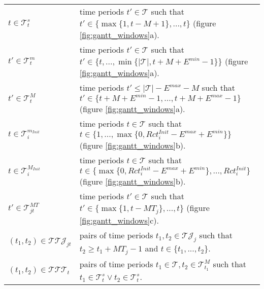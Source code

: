 \documentclass[a4paper,onecolumn,fleqn]{article}
\begin{document}
        \begin{tabular}{p{30mm}p{95mm}}
            $t \in \mathcal{T}^s_t$ &  time periods $t' \in \mathcal{T}$ such that $t' \in \{ \max{\{1, t - M+1\}},  ..., {t}\}$ (figure \ref{fig:gantt_windows}a). \\
            $t' \in \mathcal{T}^m_t$ &  time periods $t' \in \mathcal{T}$ such that $t' \in \{ {t}, ..., \min{\{|\mathcal{T}|, t + M + E^{min}-1\}}\}$ (figure \ref{fig:gantt_windows}a). \\
            $t' \in \mathcal{T}^M_t$ &  time periods $t' \leq |\mathcal{T}| - E^{max} - M$ such that $t' \in \{ t + M + E^{min}-1 , ...,  t + M + E^{max}-1 \}$ (figure \ref{fig:gantt_windows}a). \\
            $t \in \mathcal{T}^{m_{Init}}_i$ &  time periods $t \in \mathcal{T}$ such that $t \in \{ 1, ..., \max{\{0, Rct^{Init}_i - E^{max} + E^{min} \}}\}$ (figure \ref{fig:gantt_windows}b). \\
            $t \in \mathcal{T}^{M_{Init}}_i$ &  time periods $t \in \mathcal{T}$ such that $t \in \{ \max{\{0, Rct^{Init}_i - E^{max} + E^{min} \}} , ...,  Rct^{Init}_i \}$ (figure \ref{fig:gantt_windows}b). \\
            $t' \in \mathcal{T}^{MT}_{jt}$ &  time periods $t' \in \mathcal{T}$ such that $t' \in \{ \max{\{1, t - MT_j\}},  ..., {t}\}$ (figure \ref{fig:gantt_windows}c). \\
            $(t_1, t_2) \in \mathcal{T}\mathcal{T}\mathcal{J}_{jt}$ & pairs of time periods $t_1, t_2 \in \mathcal{TJ}_j$ such that $t_2 \ge t_1 + MT_j-1$ and $t \in \{t_1, ..., t_2\}$. \\
            $(t_1, t_2) \in \mathcal{T}\mathcal{T}\mathcal{T}_{t}$ & pairs of time periods $t_1 \in \mathcal{T}, t_2 \in \mathcal{T}^M_{t_1}$ such that $t_1 \in \mathcal{T}^s_{t} \lor t_2 \in \mathcal{T}^s_{t}$. \\
        \end{tabular}
\end{document}
